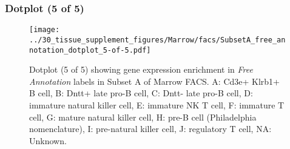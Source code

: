 \clearpage

\subsubsection{Dotplot (5 of 5)}
\begin{figure}[h]
\centering
\texttt{[image: ../30\_tissue\_supplement\_figures/Marrow/facs/SubsetA\_free\_annotation\_dotplot\_5-of-5.pdf]}

\caption{ Dotplot (5 of 5)  showing gene expression enrichment in \emph{Free Annotation} labels in Subset A of Marrow FACS. A: Cd3e+ Klrb1+ B cell, B: Dntt+ late pro-B cell, C: Dntt- late pro-B cell, D: immature natural killer cell, E: immature NK T cell, F: immature T cell, G: mature natural killer cell, H: pre-B cell (Philadelphia nomenclature), I: pre-natural killer cell, J: regulatory T cell, NA: Unknown.}
\end{figure}

